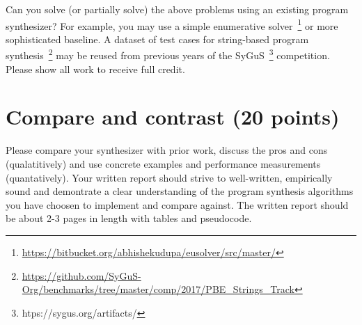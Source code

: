 \documentclass[11pt]{article}
\begin{document}
    Can you solve (or partially solve) the above problems using an existing program synthesizer? For example, you may use a simple enumerative solver~\footnote{\url{https://bitbucket.org/abhishekudupa/eusolver/src/master/}} or more sophisticated baseline. A dataset of test cases for string-based program synthesis~\footnote{\url{https://github.com/SyGuS-Org/benchmarks/tree/master/comp/2017/PBE_Strings_Track}} may be reused from previous years of the SyGuS~\footnote{htps://sygus.org/artifacts/} competition. Please show all work to receive full credit.

    \section{Compare and contrast (20 points)}

    Please compare your synthesizer with prior work, discuss the pros and cons (qualatitively) and use concrete examples and performance measurements (quantatively). Your written report should strive to well-written, empirically sound and demontrate a clear understanding of the program synthesis algorithms you have choosen to implement and compare against. The written report should be about 2-3 pages in length with tables and pseudocode.
\end{document}
